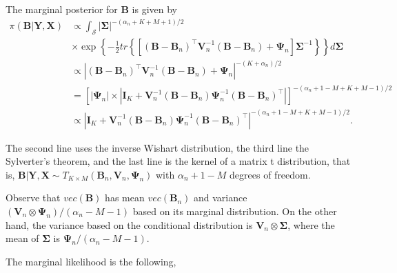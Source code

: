 The marginal posterior for ${\bm{B}}$ is given by
\begin{align*}
	\pi({\bm{B}}|{\bm{Y}},{\bm{X}})&\propto \int_{\bm{\mathcal{S}}} \left|{\bm \Sigma} \right|^{-(\alpha_n+K+M+1)/2}\\
	&\times\exp\left\lbrace -\frac{1}{2} tr\left\{\left[({\bm{B}}-{\bm{B}}_n)^{\top}{\bm{V}}_n^{-1}({\bm{B}}-{\bm{B}}_n)+{\bm{\Psi}}_n \right]  {\bm \Sigma}^{-1}\right\}\right\rbrace d{\bm{\Sigma}} \\
 	&\propto|({\bm{B}}-{\bm{B}}_n)^{\top}{\bm{V}}_n^{-1}({\bm{B}}-{\bm{B}}_n)+{\bm{\Psi}}_n|^{-(K+\alpha_n)/2}\\
 	&=\left[|{\bm{\Psi}}_n|\times|{\bm{I}}_K+{\bm{V}}_n^{-1}({\bm{B}}-{\bm{B}}_n){\bm{\Psi}}_n^{-1}({\bm{B}}-{\bm{B}}_n)^{\top}|\right]^{-(\alpha_n+1-M+K+M-1)/2}\\
 	&\propto|{\bm{I}}_K+{\bm{V}}_n^{-1}({\bm{B}}-{\bm{B}}_n){\bm{\Psi}}_n^{-1}({\bm{B}}-{\bm{B}}_n)^{\top}|^{-(\alpha_n+1-M+K+M-1)/2}.
\end{align*}

The second line uses the inverse Wishart distribution, the third line the Sylverter's theorem, and the last line is the kernel of a matrix t distribution, that is, ${\bm{B}}|{\bm{Y}},{\bm{X}}\sim T_{K\times M}({\bm{B}}_n,{\bm{V}}_n,{\bm{\Psi}}_n)$ with $\alpha_n+1-M$ degrees of freedom. 

Observe that $vec({\bm{B}})$ has mean $vec({\bm{B}}_n)$ and variance $({\bm{V}}_n\otimes{\bm{\Psi}}_n)/(\alpha_n-M-1)$ based on its marginal distribution. On the other hand, the variance based on the conditional distribution is ${\bm{V}}_n\otimes{\bm{\Sigma}}$, where the mean of ${\bm{\Sigma}}$ is ${\bm{\Psi}}_n/(\alpha_n-M-1)$.   

The marginal likelihood is the following,

